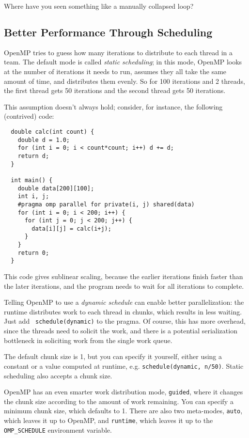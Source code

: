 {\sf Where have you seen something like a manually collapsed loop?}\\[1em]

\subsection*{Better Performance Through Scheduling}
OpenMP tries to guess how many iterations to distribute to each thread
in a team. The default mode is called \emph{static scheduling}; in
this mode, OpenMP looks at the number of iterations it needs to run,
assumes they all take the same amount of time, and distributes them
evenly. So for 100 iterations and 2 threads, the first thread gets 50
iterations and the second thread gets 50 iterations.

This assumption doesn't always hold; consider, for instance, the 
following (contrived) code:
{\small
\begin{verbatim}
  double calc(int count) {
    double d = 1.0;
    for (int i = 0; i < count*count; i++) d += d;
    return d;
  }

  int main() {
    double data[200][100];
    int i, j;
    #pragma omp parallel for private(i, j) shared(data)
    for (int i = 0; i < 200; i++) {
      for (int j = 0; j < 200; j++) {
        data[i][j] = calc(i+j);
      }
    }
    return 0;
  }
\end{verbatim}
}
This code gives sublinear scaling, because the earlier iterations 
finish faster than the later iterations, and the program needs to wait
for all iterations to complete.

Telling OpenMP to use a \emph{dynamic schedule} can enable better
parallelization: the runtime distributes work to each thread in
chunks, which results in less waiting. Just add {\tt
  schedule(dynamic)} to the pragma. Of course, this has more overhead,
since the threads need to solicit the work, and there is a potential
serialization bottleneck in soliciting work from the single work
queue. 

The default chunk size is 1, but you can specify it yourself, either
using a constant or a value computed at runtime, e.g. 
{\tt schedule(dynamic, n/50)}. Static scheduling also accepts a
chunk size.

OpenMP has an even smarter work distribution mode, {\tt guided}, where
it changes the chunk size according to the amount of work remaining.
You can specify a minimum chunk size, which defaults to 1. There
are also two meta-modes, {\tt auto}, which leaves it up to OpenMP, and
{\tt runtime}, which leaves it up to the \verb+OMP_SCHEDULE+ environment
variable.

